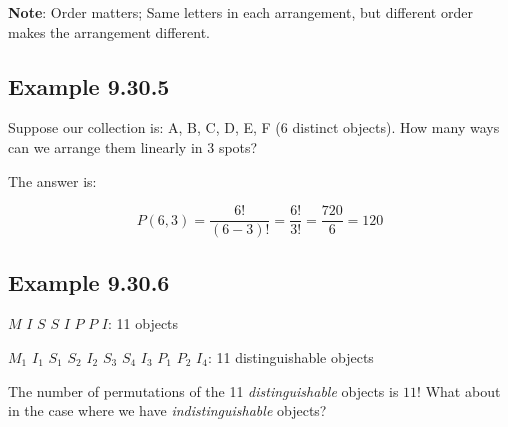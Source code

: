 \documentclass{article}
\begin{document}
\textbf{Note}: Order matters; Same letters in each arrangement, but
different order makes the arrangement different.

\subsection*{Example 9.30.5}

Suppose our collection is: A, B, C, D, E, F (6 distinct objects). How
many ways can we arrange them linearly in 3 spots?

The answer is:

\[
P(6,3)=\dfrac{6!}{(6-3)!}=\dfrac{6!}{3!}=\dfrac{720}{6}=120
\]

\subsection*{Example 9.30.6}

$M$ $I$ $S$ $S$ $I$ $P$ $P$ $I$: 11 objects

$M_1$ $I_1$ $S_1$ $S_2$ $I_2$ $S_3$ $S_4$ $I_3$ $P_1$ $P_2$ $I_4$: 11
distinguishable objects

The number of permutations of the 11 \textit{distinguishable} objects
is $11!$ What about in the case where we have
\textit{indistinguishable} objects?


\end{document}
